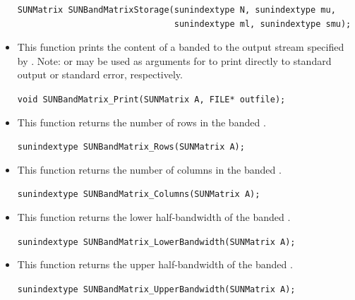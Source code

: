\begin{itemize}
  \begin{verbatim}
SUNMatrix SUNBandMatrixStorage(sunindextype N, sunindextype mu,
                               sunindextype ml, sunindextype smu);
  \end{verbatim}


\item {}

  This function prints the content of a banded  to the
  output stream specified by .  Note: 
  or  may be used as arguments for  to print
  directly to standard output or standard error, respectively.

  \verb|void SUNBandMatrix_Print(SUNMatrix A, FILE* outfile);|


\item {}

  This function returns the number of rows in the banded .

  \verb|sunindextype SUNBandMatrix_Rows(SUNMatrix A);|


\item {}

  This function returns the number of columns in the banded .

  \verb|sunindextype SUNBandMatrix_Columns(SUNMatrix A);|


\item {}

  This function returns the lower half-bandwidth of the banded .

  \verb|sunindextype SUNBandMatrix_LowerBandwidth(SUNMatrix A);|


\item {}

  This function returns the upper half-bandwidth of the banded .

  \verb|sunindextype SUNBandMatrix_UpperBandwidth(SUNMatrix A);|



\end{itemize}
